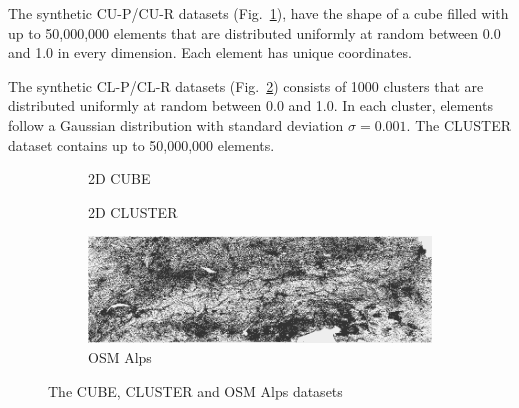 \documentclass{vldb}
\begin{document}
The synthetic CU-P/CU-R datasets (Fig.~\ref{fig:DScube}), have the shape of a cube filled with up to 50,000,000 elements that are distributed uniformly at random between 0.0 and 1.0 in every dimension. Each element has unique coordinates.

The synthetic CL-P/CL-R datasets (Fig.~\ref{fig:DScluster}) consists of 1000 clusters that are distributed uniformly at random between 0.0 and 1.0. In each cluster, elements follow a Gaussian distribution with standard deviation $\sigma = 0.001$.
The CLUSTER dataset contains up to 50,000,000 elements. 


\begin{figure}
	\centering
	\begin{subfigure}{0.50\columnwidth}
		\centering
		\caption{2D CUBE}
		\label{fig:DScube}
	\end{subfigure}%
	\begin{subfigure}{0.50\columnwidth}
		\centering
		\caption{2D CLUSTER}
		\label{fig:DScluster}
	\end{subfigure}
	\begin{subfigure}{\columnwidth}
		\centering
		\includegraphics[scale=0.4]{OSM-Alps.png}
		\caption{OSM Alps}
		\label{fig:DSosmAlps}
	\end{subfigure}
	\caption{The CUBE, CLUSTER and OSM Alps datasets}
	\label{fig:datasets}
\end{figure}
\end{document}
